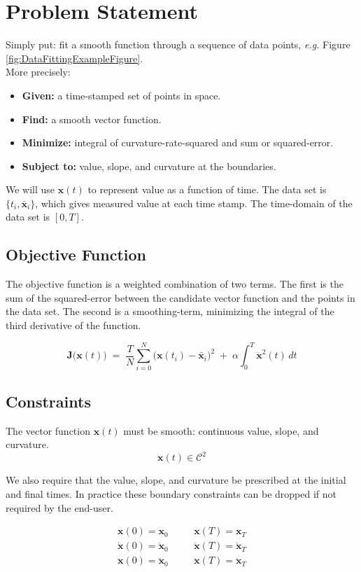 \section{Problem Statement}
\label{sec:ProblemStatement}

Simply put: fit a smooth function through a sequence of data points,
\textit{e.g.} Figure \ref{fig:DataFittingExampleFigure}. \\
More precisely:
\begin{itemize}
  \setlength\itemsep{0em}
  \item \textbf{Given:} a time-stamped set of points in space.
  \item \textbf{Find:} a smooth vector function.
  \item \textbf{Minimize:} integral of curvature-rate-squared and sum or squared-error.
  \item \textbf{Subject to:} value, slope, and curvature at the boundaries.
\end{itemize}

\par
We will use $\bm{x}(t)$ to represent value as a function of time.
The data set is $\{t_i, \bar{\bm{x}}_i\}$, which gives measured value at each time stamp.
The time-domain of the data set is $[0, T]$.

\subsection{Objective Function}

The objective function is a weighted combination of two terms.
The first is the sum of the squared-error between the candidate vector function and the points in the data set.
The second is a smoothing-term, minimizing the integral of the third derivative of the function.

\begin{equation}
  \bm{J}\big(\bm{x}(t)\big) \; =   \;
    \frac{T}{N}  \sum_{i=0}^N \big( \bm{x}(t_i) - \bar{\bm{x}}_i \big)^2
     \; +   \; \alpha \! \int_0^T \! \dddot{\bm{x}}^2(t) \, dt
  \label{eqn:continuousObjectiveFunction}
\end{equation}

\subsection{Constraints}

The vector function $\bm{x}(t)$ must be smooth: continuous value, slope, and curvature.
\begin{equation}
  \bm{x}(t) \in \mathcal{C}^2
\end{equation}

We also require that the value, slope, and curvature be prescribed at the initial and final times.
In practice these boundary constraints can be dropped if not required by the end-user.

\begin{align}
  \bm{x}(0) = \bm{x}_0  & \quad &  \bm{x}(T) = \bm{x}_T \\
  \dot{\bm{x}}(0) = \dot{\bm{x}}_0  & \quad & \dot{\bm{x}}(T) = \dot{\bm{x}}_T \\
  \ddot{\bm{x}}(0) = \ddot{\bm{x}}_0  & \quad & \ddot{\bm{x}}(T) = \ddot{\bm{x}}_T
\end{align}

